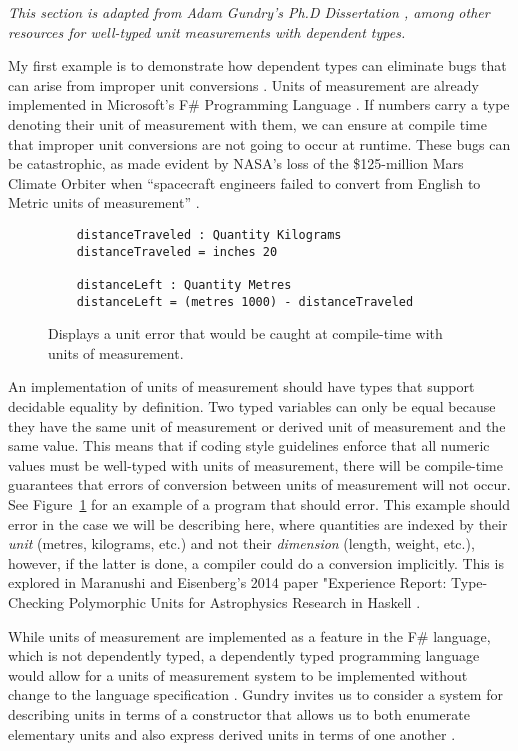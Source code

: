 \textit{This section is adapted from Adam Gundry's Ph.D Dissertation
\cite{gundry2013}, among other resources for well-typed unit measurements with
dependent types.}

My first example is to demonstrate how dependent types can eliminate bugs that
can arise from improper unit conversions \cite{gundry2013}. Units of measurement
are already implemented in Microsoft's F\# Programming Language
\cite{kennedy2009,f_sharp_units}. If numbers carry a type denoting their unit of
measurement with them, we can ensure at compile time that improper unit
conversions are not going to occur at runtime. These bugs can be catastrophic,
as made evident by NASA's loss of the \$125-million Mars Climate Orbiter when
``spacecraft engineers failed to convert from English to Metric units of
measurement'' \cite{hotz1999}. 

\begin{figure}[ht!]
  \caption{Displays a unit error that would be caught at compile-time with units of measurement.}
  \label{unit_error}
  \begin{lstlisting}
    distanceTraveled : Quantity Kilograms
    distanceTraveled = inches 20

    distanceLeft : Quantity Metres
    distanceLeft = (metres 1000) - distanceTraveled
  \end{lstlisting}
\end{figure}

An implementation of units of measurement should have types that support
decidable equality by definition. Two typed variables can only be equal because
they have the same unit of measurement or derived unit of measurement and the
same value. This means that if coding style guidelines enforce that all numeric
values must be well-typed with units of measurement, there will be compile-time
guarantees that errors of conversion between units of measurement will not
occur. See Figure~\ref{unit_error} for an example of a program that should
error. This example should error in the case we will be describing here, where
quantities are indexed by their \textit{unit} (metres, kilograms, etc.) and not
their \textit{dimension} (length, weight, etc.), however, if the latter is done,
a compiler could do a conversion implicitly. This is explored in Maranushi and
Eisenberg's 2014 paper "Experience Report: Type-Checking Polymorphic Units for
Astrophysics Research in Haskell \cite{eisenberg2014}. 

While units of measurement are implemented as a feature in the F\# language,
which is not dependently typed, a dependently typed programming language would
allow for a units of measurement system to be implemented without change to the
language specification \cite{gundry2013}. Gundry invites us to consider a
system for describing units in terms of a constructor that allows us to both
enumerate elementary units and also express derived units in terms of one
another \cite{gundry2013}. 

